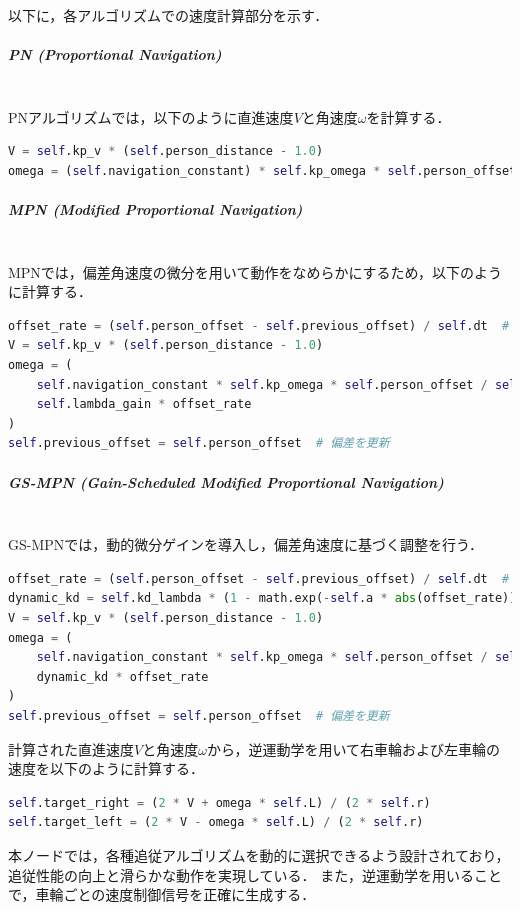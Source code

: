 以下に，各アルゴリズムでの速度計算部分を示す．

\subparagraph{PN (Proportional Navigation)}\mbox{}\\
PNアルゴリズムでは，以下のように直進速度$V$と角速度$\omega$を計算する．
\begin{lstlisting}[language=Python, caption=PNの計算部分 (Roboware\_node\_np.py)]
V = self.kp_v * (self.person_distance - 1.0)
omega = (self.navigation_constant) * self.kp_omega * self.person_offset / max((self.person_distance), 1.0)
\end{lstlisting}

\subparagraph{MPN (Modified Proportional Navigation)}\mbox{}\\
MPNでは，偏差角速度の微分を用いて動作をなめらかにするため，以下のように計算する．
\begin{lstlisting}[language=Python, caption=MPNの計算部分 (Roboware\_node\_mpn.py)]
offset_rate = (self.person_offset - self.previous_offset) / self.dt  # 偏差角速度
V = self.kp_v * (self.person_distance - 1.0)
omega = (
    self.navigation_constant * self.kp_omega * self.person_offset / self.person_distance +
    self.lambda_gain * offset_rate
)
self.previous_offset = self.person_offset  # 偏差を更新
\end{lstlisting}

\subparagraph{GS-MPN (Gain-Scheduled Modified Proportional Navigation)}\mbox{}\\
GS-MPNでは，動的微分ゲインを導入し，偏差角速度に基づく調整を行う．
\begin{lstlisting}[language=Python, caption=GS-MPNの計算部分 (Roboware\_node\_newmpn.py)]
offset_rate = (self.person_offset - self.previous_offset) / self.dt  # 偏差角速度
dynamic_kd = self.kd_lambda * (1 - math.exp(-self.a * abs(offset_rate))) / (1 + math.exp(-self.a * abs(offset_rate)))
V = self.kp_v * (self.person_distance - 1.0)
omega = (
    self.navigation_constant * self.kp_omega * self.person_offset / self.person_distance +
    dynamic_kd * offset_rate
)
self.previous_offset = self.person_offset  # 偏差を更新
\end{lstlisting}



計算された直進速度$V$と角速度$\omega$から，逆運動学を用いて右車輪および左車輪の速度を以下のように計算する．
\begin{lstlisting}[language=Python, caption=逆運動学を用いた車輪速度の計算]
self.target_right = (2 * V + omega * self.L) / (2 * self.r)
self.target_left = (2 * V - omega * self.L) / (2 * self.r)
\end{lstlisting}


本ノードでは，各種追従アルゴリズムを動的に選択できるよう設計されており，追従性能の向上と滑らかな動作を実現している．
また，逆運動学を用いることで，車輪ごとの速度制御信号を正確に生成する．
